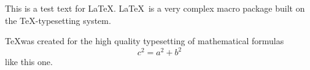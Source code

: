 \documentclass{article}
\begin{document}
This is a test text for \LaTeX .
\LaTeX\ is a very complex macro package
built on the \TeX -typesetting system.

\TeX was created for the high quality
typesetting of mathematical formulas 
\begin{equation}
c^2=a^2+b^2
\end{equation}
like this one.
\end{document}
